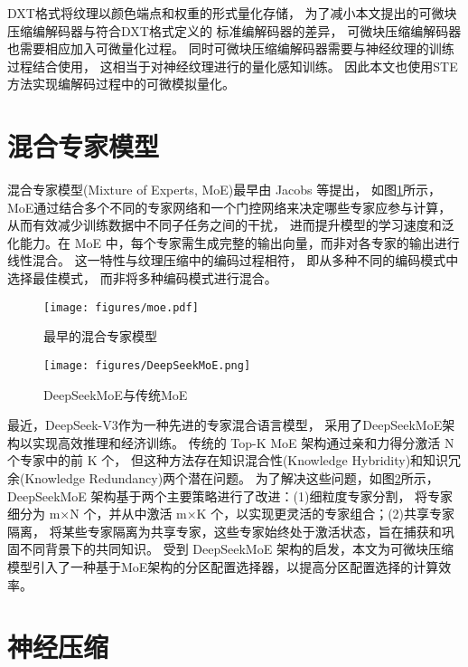 DXT格式将纹理以颜色端点和权重的形式量化存储，
为了减小本文提出的可微块压缩编解码器与符合DXT格式定义的
标准编解码器的差异，
可微块压缩编解码器也需要相应加入可微量化过程。
同时可微块压缩编解码器需要与神经纹理的训练过程结合使用，
这相当于对神经纹理进行的量化感知训练。
因此本文也使用STE方法实现编解码过程中的可微模拟量化。


\section{混合专家模型}

混合专家模型(Mixture of Experts, MoE)最早由 Jacobs 等\cite{jacobs1991adaptive}提出，
如图\ref{fig:MoE}所示，MoE通过结合多个不同的专家网络和一个门控网络来决定哪些专家应参与计算，从而有效减少训练数据中不同子任务之间的干扰，
进而提升模型的学习速度和泛化能力。在 MoE 中，每个专家需生成完整的输出向量，而非对各专家的输出进行线性混合。
这一特性与纹理压缩中的编码过程相符，
即从多种不同的编码模式中选择最佳模式，
而非将多种编码模式进行混合。

\begin{figure}[htbp]
    \centering
    \texttt{[image: figures/moe.pdf]}
    \caption{最早的混合专家模型\cite{jacobs1991adaptive}}
    \label{fig:MoE}
\end{figure}

\begin{figure}[htbp]
    \centering
    \texttt{[image: figures/DeepSeekMoE.png]}
    \caption{DeepSeekMoE与传统MoE\cite{dai2024deepseekmoe}}
    \label{fig:DeepSeekMoE}
\end{figure}

最近，DeepSeek-V3\cite{liu2024deepseek}作为一种先进的专家混合语言模型，
采用了DeepSeekMoE架构\cite{dai2024deepseekmoe}以实现高效推理和经济训练。
传统的 Top-K MoE 架构通过亲和力得分激活 N 个专家中的前 K 个，
但这种方法存在知识混合性(Knowledge Hybridity)和知识冗余(Knowledge Redundancy)两个潜在问题。
为了解决这些问题，如图\ref{fig:DeepSeekMoE}所示，DeepSeekMoE 架构基于两个主要策略进行了改进：(1)细粒度专家分割，
将专家细分为 m×N 个，并从中激活 m×K 个，以实现更灵活的专家组合；(2)共享专家隔离，
将某些专家隔离为共享专家，这些专家始终处于激活状态，旨在捕获和巩固不同背景下的共同知识。
受到 DeepSeekMoE 架构的启发，本文为可微块压缩模型引入了一种基于MoE架构的分区配置选择器，以提高分区配置选择的计算效率。


\section{神经压缩}


